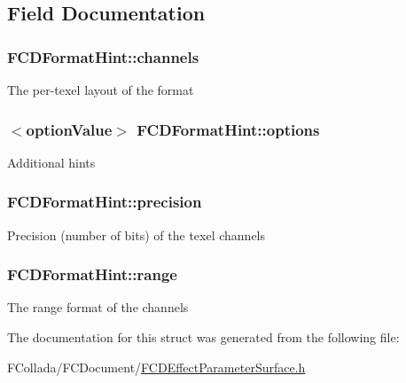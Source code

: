 \subsection{Field Documentation}
\hypertarget{structFCDFormatHint_acfb2c3d8e09bcb65430d2d733ee2023c}{
\subsubsection[{channels}]{ {\bf FCDFormatHint::channels}}}
\label{structFCDFormatHint_acfb2c3d8e09bcb65430d2d733ee2023c}
The per-\/texel layout of the format \hypertarget{structFCDFormatHint_aaa86d7af04b996fb90c551b2d401a0be}{
\subsubsection[{options}]{$<${\bf optionValue}$>$ {\bf FCDFormatHint::options}}}
\label{structFCDFormatHint_aaa86d7af04b996fb90c551b2d401a0be}
Additional hints \hypertarget{structFCDFormatHint_ab9648a25aadd4c375d3b574f3c980d74}{
\subsubsection[{precision}]{ {\bf FCDFormatHint::precision}}}
\label{structFCDFormatHint_ab9648a25aadd4c375d3b574f3c980d74}
Precision (number of bits) of the texel channels \hypertarget{structFCDFormatHint_ab999301788a29244f9b81e9dd6fe4277}{
\subsubsection[{range}]{ {\bf FCDFormatHint::range}}}
\label{structFCDFormatHint_ab999301788a29244f9b81e9dd6fe4277}
The range format of the channels 

The documentation for this struct was generated from the following file:\begin{DoxyCompactItemize}
\item 
FCollada/FCDocument/\hyperlink{FCDEffectParameterSurface_8h}{FCDEffectParameterSurface.h}\end{DoxyCompactItemize}
